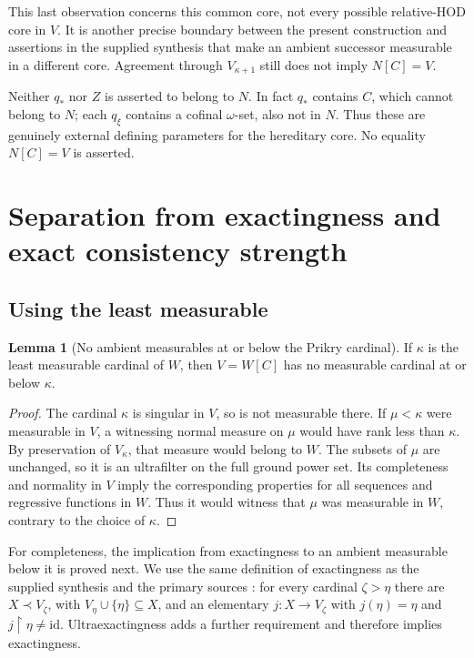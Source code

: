 \documentclass[11pt,letterpaper]{article}
\theoremstyle{definition}
\newtheorem{lemma}[definition]{Lemma}
\numberwithin{equation}{section}
\newcommand{\id}{\mathrm{id}}
\newcommand{\restr}{\mathbin{\upharpoonright}}
\begin{document}
This last observation concerns this common core, not every possible relative-HOD core in $V$. It is another precise boundary between the present construction and assertions in the supplied synthesis that make an ambient successor measurable in a different core. Agreement through $V_{\kappa+1}$ still does not imply $N[C]=V$.

Neither $q_*$ nor $Z$ is asserted to belong to $N$. In fact $q_*$ contains $C$, which cannot belong to $N$; each $q_\xi$ contains a cofinal $\omega$-set, also not in $N$. Thus these are genuinely external defining parameters for the hereditary core. No equality $N[C]=V$ is asserted.

\section{Separation from exactingness and exact consistency strength}\label{sec:strength}

\subsection{Using the least measurable}

\begin{lemma}[No ambient measurables at or below the Prikry cardinal]\label{lem:least}
If $\kappa$ is the least measurable cardinal of $W$, then $V=W[C]$ has no measurable cardinal at or below $\kappa$.
\end{lemma}
\begin{proof}
The cardinal $\kappa$ is singular in $V$, so is not measurable there. If $\mu<\kappa$ were measurable in $V$, a witnessing normal measure on $\mu$ would have rank less than $\kappa$. By preservation of $V_\kappa$, that measure would belong to $W$. The subsets of $\mu$ are unchanged, so it is an ultrafilter on the full ground power set. Its completeness and normality in $V$ imply the corresponding properties for all sequences and regressive functions in $W$. Thus it would witness that $\mu$ was measurable in $W$, contrary to the choice of $\kappa$.
\end{proof}

For completeness, the implication from exactingness to an ambient measurable below it is proved next. We use the same definition of exactingness as the supplied synthesis and the primary sources \cite{abl,abgl}: for every cardinal $\zeta>\eta$ there are $X\prec V_\zeta$, with $V_\eta\cup\{\eta\}\subseteq X$, and an elementary $j:X\to V_\zeta$ with $j(\eta)=\eta$ and $j\restr\eta\neq\id$. Ultraexactingness adds a further requirement and therefore implies exactingness.
\end{document}
